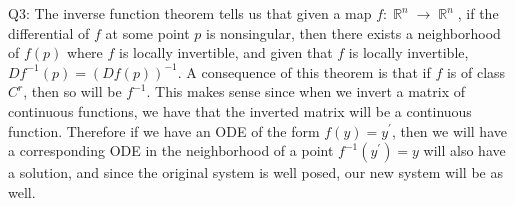 \documentclass[letterpaper]{article}
\DeclareMathOperator{\R}{\mathbb{R}}
\begin{document}
\noindent Q3: The inverse function theorem tells us that given a map $f:\R^n \to \R^n$, if the differential of $f$ at some point $p$ is nonsingular, then there exists a neighborhood of $f(p)$ where $f$ is locally invertible, and given that $f$ is locally invertible, $Df^{-1}(p) = (Df(p))^{-1}$. A consequence of this theorem is that if $f$ is of class $C^r$, then so will be $f^{-1}$. This makes sense since when we invert a matrix of continuous functions, we have that the inverted matrix will be a continuous function. Therefore if we have an ODE of the form $f(y) = y^\prime$, then we will have a corresponding ODE in the neighborhood of a point $f^{-1}(y^\prime) = y$ will also have a solution, and since the original system is well posed, our new system will be as well. 
\end{document}
